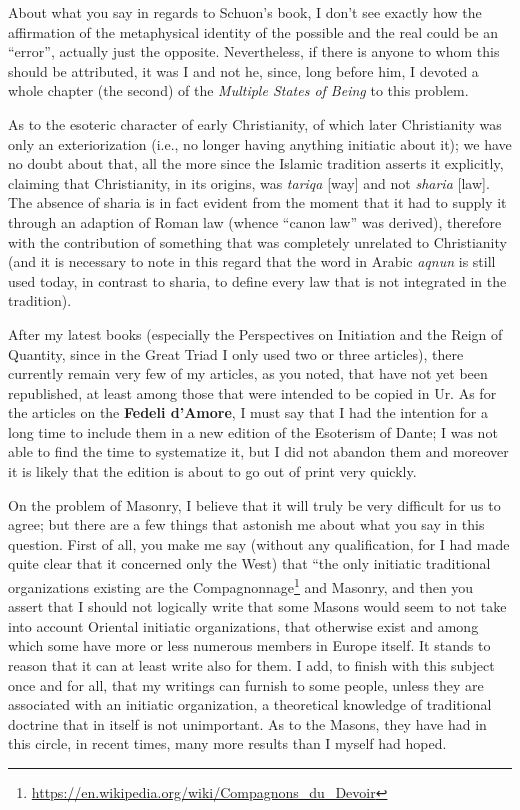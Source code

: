 About what you say in regards to Schuon's book, I don't see exactly how the affirmation of the metaphysical identity of the possible and the real could be an “error”, actually just the opposite. Nevertheless, if there is anyone to whom this should be attributed, it was I and not he, since, long before him, I devoted a whole chapter (the second) of the \emph{Multiple States of Being} to this problem.

As to the esoteric character of early Christianity, of which later Christianity was only an exteriorization (i.e., no longer having anything initiatic about it); we have no doubt about that, all the more since the Islamic tradition asserts it explicitly, claiming that Christianity, in its origins, was \emph{tariqa} [way] and not \emph{sharia} [law]. The absence of sharia is in fact evident from the moment that it had to supply it through an adaption of Roman law (whence “canon law” was derived), therefore with the contribution of something that was completely unrelated to Christianity (and it is necessary to note in this regard that the word in Arabic \emph{aqnun} is still used today, in contrast to sharia, to define every law that is not integrated in the tradition).

After my latest books (especially the Perspectives on Initiation and the Reign of Quantity, since in the Great Triad I only used two or three articles), there currently remain very few of my articles, as you noted, that have not yet been republished, at least among those that were intended to be copied in Ur. As for the articles on the \textbf{Fedeli d'Amore}, I must say that I had the intention for a long time to include them in a new edition of the Esoterism of Dante; I was not able to find the time to systematize it, but I did not abandon them and moreover it is likely that the edition is about to go out of print very quickly.

On the problem of Masonry, I believe that it will truly be very difficult for us to agree; but there are a few things that astonish me about what you say in this question. First of all, you make me say (without any qualification, for I had made quite clear that it concerned only the West) that “the only initiatic traditional organizations existing are the Compagnonnage\footnote{\url{https://en.wikipedia.org/wiki/Compagnons_du_Devoir}} and Masonry, and then you assert that I should not logically write that some Masons would seem to not take into account Oriental initiatic organizations, that otherwise exist and among which some have more or less numerous members in Europe itself. It stands to reason that it can at least write also for them. I add, to finish with this subject once and for all, that my writings can furnish to some people, unless they are associated with an initiatic organization, a theoretical knowledge of traditional doctrine that in itself is not unimportant. As to the Masons, they have had in this circle, in recent times, many more results than I myself had hoped.

